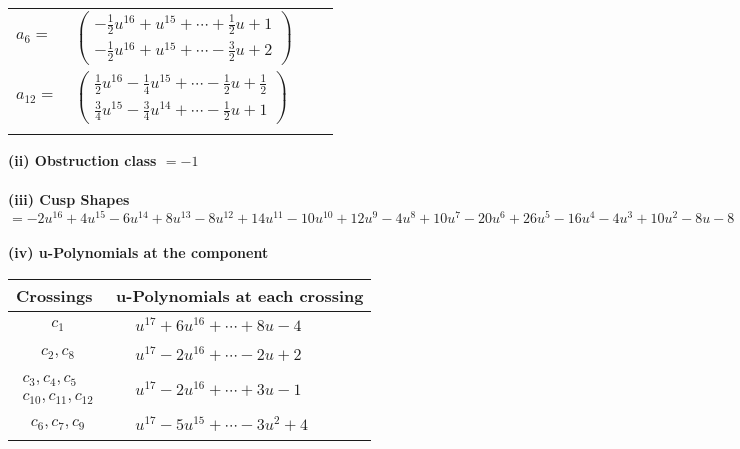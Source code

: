 \documentclass[1p]{elsarticle_modified}
\theoremstyle{definition}
\begin{document}
\begin{tabular}{m{7pt} m{180pt} m{7pt} m{180pt} }
\flushright $a_{6}=$&$\begin{pmatrix}-\frac{1}{2} u^{16}+u^{15}+\cdots+\frac{1}{2} u+1\\-\frac{1}{2} u^{16}+u^{15}+\cdots-\frac{3}{2} u+2\end{pmatrix}$ \\
\flushright $a_{12}=$&$\begin{pmatrix}\frac{1}{2} u^{16}-\frac{1}{4} u^{15}+\cdots-\frac{1}{2} u+\frac{1}{2}\\\frac{3}{4} u^{15}-\frac{3}{4} u^{14}+\cdots-\frac{1}{2} u+1\end{pmatrix}$\\&\end{tabular}
\flushleft \textbf{(ii) Obstruction class $= -1$}\\~\\
\flushleft \textbf{(iii) Cusp Shapes $= -2 u^{16}+4 u^{15}-6 u^{14}+8 u^{13}-8 u^{12}+14 u^{11}-10 u^{10}+12 u^9-4 u^8+10 u^7-20 u^6+26 u^5-16 u^4-4 u^3+10 u^2-8 u-8$}\\~\\
\newpage\renewcommand{\arraystretch}{1}
\flushleft \textbf{(iv) u-Polynomials at the component}\newline \\
\begin{tabular}{m{50pt}|m{274pt}}
Crossings & \hspace{64pt}u-Polynomials at each crossing \\
\hline $$\begin{aligned}c_{1}\end{aligned}$$&$\begin{aligned}
&u^{17}+6 u^{16}+\cdots+8 u-4
\end{aligned}$\\
\hline $$\begin{aligned}c_{2},c_{8}\end{aligned}$$&$\begin{aligned}
&u^{17}-2 u^{16}+\cdots-2 u+2
\end{aligned}$\\
\hline $$\begin{aligned}c_{3},c_{4},c_{5}\\c_{10},c_{11},c_{12}\end{aligned}$$&$\begin{aligned}
&u^{17}-2 u^{16}+\cdots+3 u-1
\end{aligned}$\\
\hline $$\begin{aligned}c_{6},c_{7},c_{9}\end{aligned}$$&$\begin{aligned}
&u^{17}-5 u^{15}+\cdots-3 u^2+4
\end{aligned}$\\
\hline
\end{tabular}\\~\\
\end{document}

